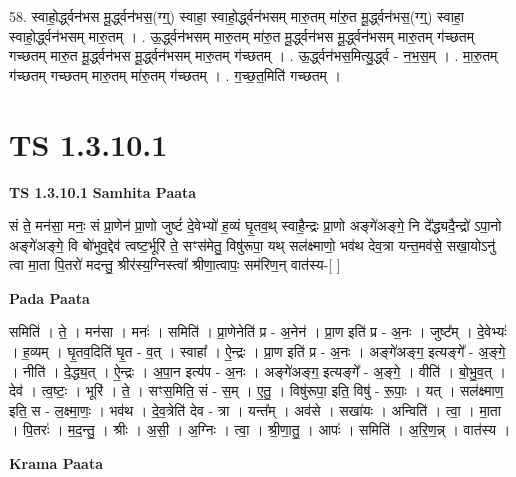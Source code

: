 \documentclass[17pt]{extarticle}
\begin{document}
58. स्वाहो॒र्द्ध्वन॑भस मू॒र्द्ध्वन॑भस॒(ग्ग्॒) स्वाहा॒ स्वाहो॒र्द्ध्वन॑भसम् मारु॒तम् मा॑रु॒त मू॒र्द्ध्वन॑भस॒(ग्ग्॒) स्वाहा॒ स्वाहो॒र्द्ध्वन॑भसम् मारु॒तम् । . ऊ॒र्द्ध्वन॑भसम् मारु॒तम् मा॑रु॒त मू॒र्द्ध्वन॑भस मू॒र्द्ध्वन॑भसम् मारु॒तम् ग॑च्छतम् गच्छतम् मारु॒त मू॒र्द्ध्वन॑भस मू॒र्द्ध्वन॑भसम् मारु॒तम् ग॑च्छतम् । . ऊ॒र्द्ध्वन॑भस॒मित्यु॒र्द्ध्व - न॒भ॒स॒म् । . मा॒रु॒तम् ग॑च्छतम् गच्छतम् मारु॒तम् मा॑रु॒तम् ग॑च्छतम् । . ग॒च्छ॒त॒मिति॑ गच्छतम् । \newline
\pagebreak
{}

\section{ TS 1.3.10.1 }

\textbf{TS 1.3.10.1 } \newline
\textbf{Samhita Paata} \newline

सं ते॒ मन॑सा॒ मनः॒ सं प्रा॒णेन॑ प्रा॒णो जुष्टं॑ दे॒वेभ्यो॑ ह॒व्यं घृ॒तव॒थ् स्वाहै॒न्द्रः प्रा॒णो अङ्गे॑अङ्गे॒ नि दे᳚द्ध्यदै॒न्द्रो॑ ऽपा॒नो अङ्गे॑अङ्गे॒ वि बो॑भुव॒द्देव॑ त्वष्ट॒र्भूरि॑ ते॒ सꣳस॑मेतु॒ विषु॑रूपा॒ यथ् सल॑क्ष्माणो॒ भव॑थ देव॒त्रा यन्त॒मव॑से॒ सखा॒योऽनु॑ त्वा मा॒ता पि॒तरो॑ मदन्तु॒ श्रीर॑स्य॒ग्निस्त्वा᳚ श्रीणा॒त्वापः॒ सम॑रिण॒न् वात॑स्य-[ ] \newline

\textbf{Pada Paata} \newline

समिति॑ । ते॒ । मन॑सा । मनः॑ । समिति॑ । प्रा॒णेनेति॑ प्र - अ॒नेन॑ । प्रा॒ण इति॑ प्र - अ॒नः । जुष्ट᳚म् । दे॒वेभ्यः॑ । ह॒व्यम् । घृ॒तव॒दिति॑ घृ॒त - व॒त् । स्वाहा᳚ । ऐ॒न्द्रः । प्रा॒ण इति॑ प्र - अ॒नः । अङ्गे॑अङ्ग॒ इत्यङ्गे᳚ - अ॒ङ्गे॒ । नीति॑ । दे॒द्ध्य॒त् । ऐ॒न्द्रः । अ॒पा॒न इत्य॑प - अ॒नः । अङ्गे॑अङ्ग॒ इत्यङ्गे᳚ - अ॒ङ्गे॒ । वीति॑ । बो॒भु॒व॒त् । देव॑ । त्व॒ष्टः॒ । भूरि॑ । ते॒ । सꣳस॒मिति॒ सं - स॒म् । ए॒तु॒ । विषु॑रूपा॒ इति॒ विषु॑ - रू॒पाः॒ । यत् । सल॑क्ष्माण॒ इति॒ स - ल॒क्ष्मा॒णः॒ । भव॑थ । दे॒व॒त्रेति॑ देव - त्रा । यन्त᳚म् । अव॑से । सखा॑यः । अन्विति॑ । त्वा॒ । मा॒ता । पि॒तरः॑ । म॒द॒न्तु॒ । श्रीः । अ॒सी॒ । अ॒ग्निः । त्वा॒ । श्री॒णा॒तु॒ । आपः॑ । समिति॑ । अ॒रि॒ण॒न्न् । वात॑स्य ।  \newline


\textbf{Krama Paata} \newline
\end{document}
